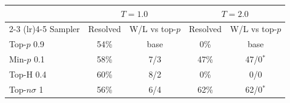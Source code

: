\begin{tabular}{lcccc}
\toprule
 & \multicolumn{2}{c}{$T{=}1.0$} & \multicolumn{2}{c}{$T{=}2.0$} \\
\cmidrule(lr){2-3} \cmidrule(lr){4-5}
Sampler & Resolved & W/L vs top-$p$ & Resolved & W/L vs top-$p$ \\
\midrule
Top-$p$ 0.9 & 54\% & base & 0\% & base \\
Min-$p$ 0.1 & 58\% & 7/3 & 47\% & 47/0$^{*}$ \\
Top-H 0.4 & 60\% & 8/2 & 0\% & 0/0 \\
Top-$n\sigma$ 1 & 56\% & 6/4 & 62\% & 62/0$^{*}$ \\
\bottomrule
\end{tabular}
